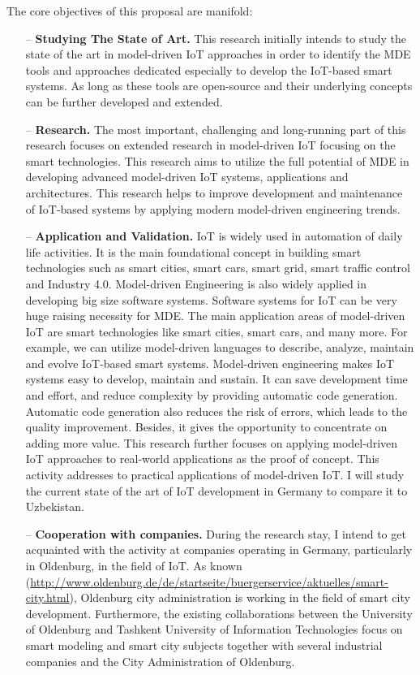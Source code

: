\documentclass[10pt, oneside]{article}
\begin{document}
The core objectives of this proposal are manifold:
\begin{itemize}
\item[--] \textbf{Studying The State of Art.} This research initially intends to study the state of the art in model-driven IoT approaches in order to identify the MDE tools and approaches dedicated especially to develop the IoT-based smart systems. As long as these tools are open-source and their underlying concepts can be further developed and extended. 
\item[--] \textbf{Research.} The most important, challenging and long-running part of this research focuses on extended research in model-driven IoT focusing on the smart technologies. This research aims to utilize the full potential of MDE in developing advanced model-driven IoT systems, applications and architectures. This research helps to improve development and maintenance of IoT-based systems by applying modern model-driven engineering trends.
\item[--] \textbf{Application and Validation.} IoT is widely used in automation of daily life activities. It is the main foundational concept in building smart technologies such as smart cities, smart cars, smart grid, smart traffic control and Industry 4.0. Model-driven Engineering is also widely applied in developing big size software systems. Software systems for IoT can be very huge raising necessity for MDE. The main application areas of model-driven IoT are smart technologies like smart cities, smart cars, and many more. For example, we can utilize model-driven languages to describe, analyze, maintain and evolve IoT-based smart systems. Model-driven engineering makes IoT systems easy to develop, maintain and sustain. It can save development time and effort, and reduce complexity by providing automatic code generation. Automatic code generation also reduces the risk of errors, which leads to the quality improvement. Besides, it gives the opportunity to concentrate on adding more value. This research further focuses on applying model-driven IoT approaches to real-world applications as the proof of concept. This activity addresses to practical applications of model-driven IoT. I will study the current state of the art of IoT development in Germany to compare it to Uzbekistan.
\item[--] \textbf{Cooperation with companies.} During the research stay, I intend to get acquainted with the activity at companies operating in Germany, particularly in Oldenburg, in the field of IoT. As known (\url{http://www.oldenburg.de/de/startseite/buergerservice/aktuelles/smart-city.html}), Oldenburg city administration is working in the field of smart city development. Furthermore, the existing collaborations between the University of Oldenburg and Tashkent University of Information Technologies focus on smart modeling and smart city subjects together with several industrial companies and the City Administration of Oldenburg.
\end{itemize}
\end{document}
